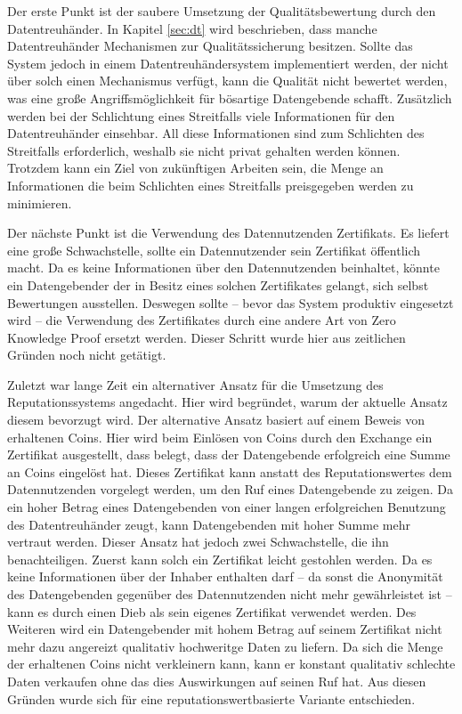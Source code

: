 \documentclass[
	fontsize=12pt,
	headings=small,
	parskip=half,           %
	bibliography=totoc,
	numbers=noenddot,       %
	open=any,               %
]{scrreprt}
\begin{document}
Der erste Punkt ist der saubere Umsetzung der Qualitätsbewertung durch den Datentreuhänder. In Kapitel \ref{sec:dt} wird beschrieben, dass manche Datentreuhänder Mechanismen zur Qualitätssicherung besitzen. Sollte das System jedoch in einem Datentreuhändersystem implementiert werden, der nicht über solch einen Mechanismus verfügt, kann die Qualität nicht bewertet werden, was eine große Angriffsmöglichkeit für bösartige Datengebende schafft. Zusätzlich werden bei der Schlichtung eines Streitfalls viele Informationen für den Datentreuhänder einsehbar. All diese Informationen sind zum Schlichten des Streitfalls erforderlich, weshalb sie nicht privat gehalten werden können. Trotzdem kann ein Ziel von zukünftigen Arbeiten sein, die Menge an Informationen die beim Schlichten eines Streitfalls preisgegeben werden zu minimieren.

Der nächste Punkt ist die Verwendung des Datennutzenden Zertifikats. Es liefert eine große Schwachstelle, sollte ein Datennutzender sein Zertifikat öffentlich macht. Da es keine Informationen über den Datennutzenden beinhaltet, könnte ein Datengebender der in Besitz eines solchen Zertifikates gelangt, sich selbst Bewertungen ausstellen. Deswegen sollte -- bevor das System produktiv eingesetzt wird -- die Verwendung des Zertifikates durch eine andere Art von Zero Knowledge Proof ersetzt werden. Dieser Schritt wurde hier aus zeitlichen Gründen noch nicht getätigt.

Zuletzt war lange Zeit ein alternativer Ansatz für die Umsetzung des Reputationssystems angedacht. Hier wird begründet, warum der aktuelle Ansatz diesem bevorzugt wird. Der alternative Ansatz basiert auf einem Beweis von erhaltenen Coins. Hier wird beim Einlösen von Coins durch den Exchange ein Zertifikat ausgestellt, dass belegt, dass der Datengebende erfolgreich eine Summe an Coins eingelöst hat. Dieses Zertifikat kann anstatt des Reputationswertes dem Datennutzenden vorgelegt werden, um den Ruf eines Datengebende zu zeigen. Da ein hoher Betrag eines Datengebenden von einer langen erfolgreichen Benutzung des Datentreuhänder zeugt, kann Datengebenden mit hoher Summe mehr vertraut werden. Dieser Ansatz hat jedoch zwei Schwachstelle, die ihn benachteiligen. Zuerst kann solch ein Zertifikat leicht gestohlen werden. Da es keine Informationen über der Inhaber enthalten darf -- da sonst die Anonymität des Datengebenden gegenüber des Datennutzenden nicht mehr gewährleistet ist -- kann es durch einen Dieb als sein eigenes Zertifikat verwendet werden. Des Weiteren wird ein Datengebender mit hohem Betrag auf seinem Zertifikat nicht mehr dazu angereizt qualitativ hochweritge Daten zu liefern. Da sich die Menge der erhaltenen Coins nicht verkleinern kann, kann er konstant qualitativ schlechte Daten verkaufen ohne das dies Auswirkungen auf seinen Ruf hat. Aus diesen Gründen wurde sich für eine reputationswertbasierte Variante entschieden.
\end{document}

